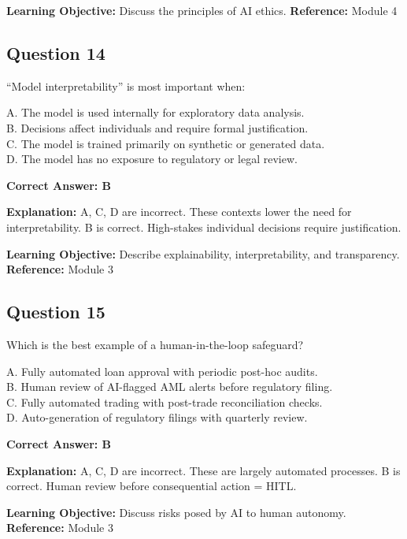 \documentclass[11pt]{article}
\begin{document}
	\textbf{Learning Objective:} Discuss the principles of AI ethics.
	\textbf{Reference:} Module 4
	
	\subsection*{Question 14}
	``Model interpretability'' is most important when:
	
	A. The model is used internally for exploratory data analysis.\\
	B. Decisions affect individuals and require formal justification.\\
	C. The model is trained primarily on synthetic or generated data.\\
	D. The model has no exposure to regulatory or legal review.
	
	\vspace{0.4em}
	\textbf{Correct Answer: B}
	
	\textbf{Explanation:}
	A, C, D are incorrect. These contexts lower the need for
	interpretability.
	B is correct. High-stakes individual decisions require justification.
	
	\textbf{Learning Objective:} Describe explainability, interpretability,
	and transparency.
	\textbf{Reference:} Module 3
	
	\subsection*{Question 15}
	Which is the best example of a human-in-the-loop safeguard?
	
	A. Fully automated loan approval with periodic post-hoc audits.\\
	B. Human review of AI-flagged AML alerts before regulatory filing.\\
	C. Fully automated trading with post-trade reconciliation checks.\\
	D. Auto-generation of regulatory filings with quarterly review.
	
	\vspace{0.4em}
	\textbf{Correct Answer: B}
	
	\textbf{Explanation:}
	A, C, D are incorrect. These are largely automated processes.
	B is correct. Human review before consequential action = HITL.
	
	\textbf{Learning Objective:} Discuss risks posed by AI to human autonomy.
	\textbf{Reference:} Module 3
	
\end{document}
